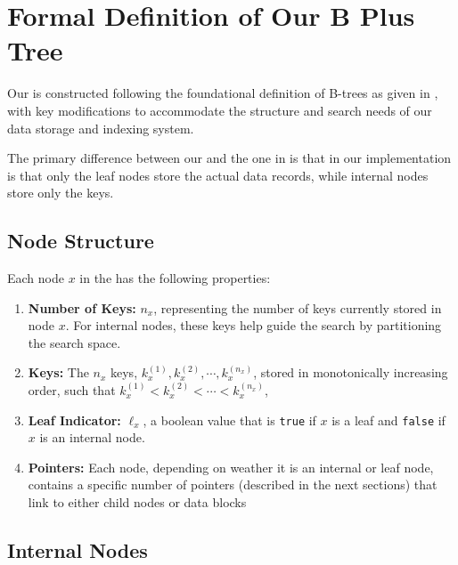 \section{Formal Definition of Our B Plus Tree}
\label{appendix:bplustreearch}

Our \bplustree is constructed following the foundational definition of B-trees as given in \cite{cormen2022introduction}, with key modifications to accommodate the structure and search needs of our data storage and indexing system. 

The primary difference between our \bplustree and the one in \cite{cormen2022introduction} is that in our implementation is that only the leaf nodes store the actual data records, while internal nodes store only the keys.

\subsection{Node Structure}

Each node $x$ in the \bplustree has the following properties:\begin{enumerate}
        \item \textbf{Number of Keys:} $n_x$, representing the number of keys currently stored in node $x$. For internal nodes, these keys help guide the search by partitioning the search space.
        \item \textbf{Keys:} The $n_x$ keys, $k^{(1)}_x,k^{(2)}_x,\cdots,k^{(n_x)}_x$, stored in monotonically increasing order, such that $k^{(1)}_x<k^{(2)}_x<\cdots<k^{(n_x)}_x$,
        \item \textbf{Leaf Indicator:} $\ell_x$, a boolean value that is \texttt{true} if $x$ is a leaf and \texttt{false} if $x$ is an internal node.
        \item \textbf{Pointers:} Each node, depending on weather it is an internal or leaf node, contains a specific number of pointers (described in the next sections) that link to either child nodes or data blocks
    \end{enumerate}

\subsection{Internal Nodes}

